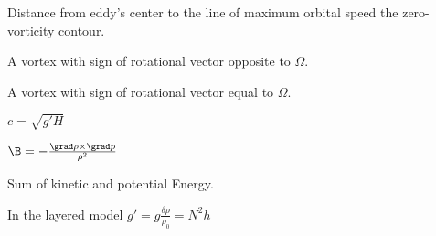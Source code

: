 \begin{fullwidth}
\begin{multicols}{2}
\begin{definition}\label{def:scale}
Distance from eddy's center to the line of maximum orbital speed \ie the zero-vorticity contour.
\end{definition}
\begin{definition}\label{def:AC}
A vortex with sign of rotational vector opposite to \href{def:Omega}{$\Omega$}.
\end{definition}
\begin{definition}[Cyclone (\C)]\label{def:C}
A vortex with sign of rotational vector equal to \href{def:Omega}{$\Omega$}.
\end{definition}
\begin{definition}\label{def:c}
$c  = \sqrt{g'H} $
\end{definition}
\begin{definition} \label{def:B }
$\B = -\frac{ \grad \rho 	\times \grad p}{ \rho^{2}} $
\end{definition}
\begin{definition} \label{def:E_k}
\end{definition}
\begin{definition} \label{def:E_m}
Sum of kinetic and potential Energy.
\end{definition}
\begin{definition}\label{def:gr}
In the layered model $g'=g \frac{\delta \rho}{\rho_0} = N^{2}h$
\end{definition}
\begin{definition}\label{def:eta}
\end{definition}
\begin{definition}\label{def:H}
\end{definition}

\end{multicols}
\end{fullwidth}
